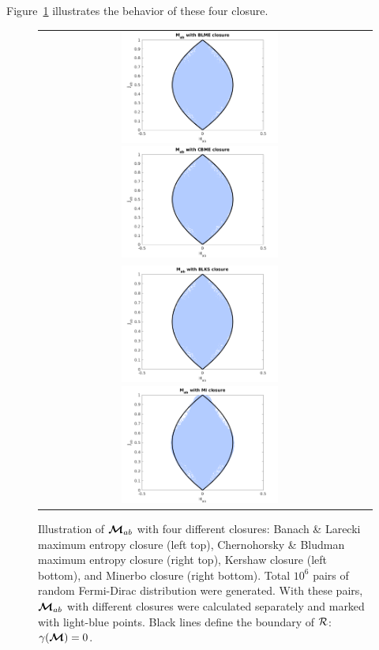Figure~\ref{fig:MabWithDifferentClosure} illustrates the behavior of these four closure.
\begin{figure}[h]
  \centering
  \begin{tabular}{cc}
    \includegraphics[width=0.5\textwidth]{figures/MabWithBLME}
    \includegraphics[width=0.5\textwidth]{figures/MabWithCBME} \\
    \includegraphics[width=0.5\textwidth]{figures/MabWithBLKS}
    \includegraphics[width=0.5\textwidth]{figures/MabWithMI}
  \end{tabular}
   \caption{Illustration of $\boldsymbol{\mathcal{M}}_{ab}$ with four different closures: Banach \& Larecki maximum entropy closure (left top), Chernohorsky \& Bludman maximum entropy closure (right top), Kershaw closure (left bottom), and Minerbo closure (right bottom).
   Total $10^{6}$ pairs of random Fermi-Dirac distribution were generated.
   With these pairs, $\boldsymbol{\mathcal{M}}_{ab}$ with different closures were calculated separately and marked with light-blue points.
   Black lines define the boundary of $\mathcal{R}$: $\gamma(\boldsymbol{\mathcal{M}}) = 0$.}
  \label{fig:MabWithDifferentClosure}
\end{figure}